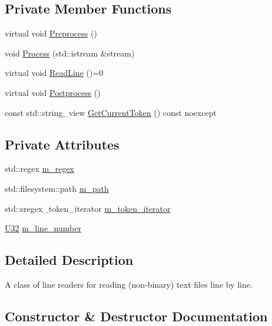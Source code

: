 \subsection*{Private Member Functions}
\begin{DoxyCompactItemize}
\item 
virtual void \mbox{\hyperlink{classmage_1_1_line_reader_ad81a84bf9ecd81b9a391698afbd5eb61}{Preprocess}} ()
\item 
void \mbox{\hyperlink{classmage_1_1_line_reader_ad351b7c68e5784d0dca690a5b8fe7528}{Process}} (std\+::istream \&stream)
\item 
virtual void \mbox{\hyperlink{classmage_1_1_line_reader_a8c81989a9d59ae31dd19e6d3961cfaf1}{Read\+Line}} ()=0
\item 
virtual void \mbox{\hyperlink{classmage_1_1_line_reader_a51775e07b5f7c9f72441e42d6d3896e1}{Postprocess}} ()
\item 
const std\+::string\+\_\+view \mbox{\hyperlink{classmage_1_1_line_reader_a543a1b133b0067cbe69e81dbad5ea0e1}{Get\+Current\+Token}} () const noexcept
\end{DoxyCompactItemize}
\subsection*{Private Attributes}
\begin{DoxyCompactItemize}
\item 
std\+::regex \mbox{\hyperlink{classmage_1_1_line_reader_a2b3c9c2f693971765c03db3752edc339}{m\+\_\+regex}}
\item 
std\+::filesystem\+::path \mbox{\hyperlink{classmage_1_1_line_reader_a05436c40af16b882c2ebd515287598f7}{m\+\_\+path}}
\item 
std\+::sregex\+\_\+token\+\_\+iterator \mbox{\hyperlink{classmage_1_1_line_reader_aa6e1c2a165ce99a124de1b257f1c0f36}{m\+\_\+token\+\_\+iterator}}
\item 
\mbox{\hyperlink{namespacemage_a41c104c036fba3756a74e19f793eeaa1}{U32}} \mbox{\hyperlink{classmage_1_1_line_reader_ab145590a7e115106c0987905fde98393}{m\+\_\+line\+\_\+number}}
\end{DoxyCompactItemize}


\subsection{Detailed Description}
A class of line readers for reading (non-\/binary) text files line by line. 

\subsection{Constructor \& Destructor Documentation}
\mbox{\label{classmage_1_1_line_reader_ab4a46321d7ea3ecda2d6390c78a7285b}} 
